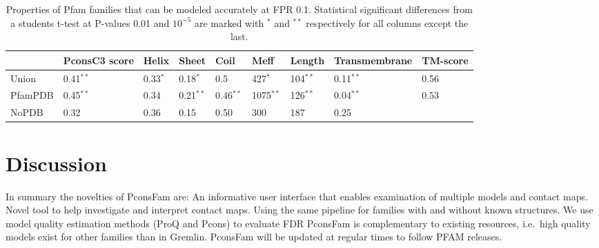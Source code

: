 \documentclass[a4,center,fleqn]{NAR}
\begin{document}
\begin{table}[tb!]
\centering
\caption{Properties of Pfam families that can be modeled accurately at FPR
0.1. Statistical significant differences
from a students t-test at P-values 0.01 and $10^{-5}$ are marked with $^*$ and
$^{**}$ respectively for all columns except the last.}

\label{tab:nopdb2}
\begin{tabular}{lllllllll}
  \hline
  & PconsC3 score & Helix & Sheet & Coil & Meff & Length & Transmembrane & TM-score\\ 
  \hline
  Union & 0.41$^{**}$ & 0.33$^{*}$ & 0.18$^{*}$ & 0.5 & 427$^*$ & 104$^{**}$ & 0.11$^{**}$ & 0.56\\ 
  PfamPDB & 0.45$^{**}$ & 0.34 & 0.21$^{**}$ & 0.46$^{**}$ & 1075$^{**}$ & 126$^{**}$ & 0.04$^{**}$ & 0.53 \\ \hline
  NoPDB & 0.32 & 0.36 & 0.15 & 0.50 & 300 & 187 & 0.25 & \\
   \hline
\end{tabular}

\end{table}



\section{Discussion}
                
In summary the novelties of PconsFam are:
An informative user interface that enables examination of multiple models and contact maps.
Novel tool to help investigate and interpret contact maps.
Using the same pipeline for families with and without known structures.
We use model quality estimation methods (ProQ and Pcons) to evaluate FDR 
PconsFam is complementary to existing resources, i.e.\ high quality models exist for other families than in Gremlin.
PconsFam will be updated at regular times to follow PFAM releases.
\end{document}
